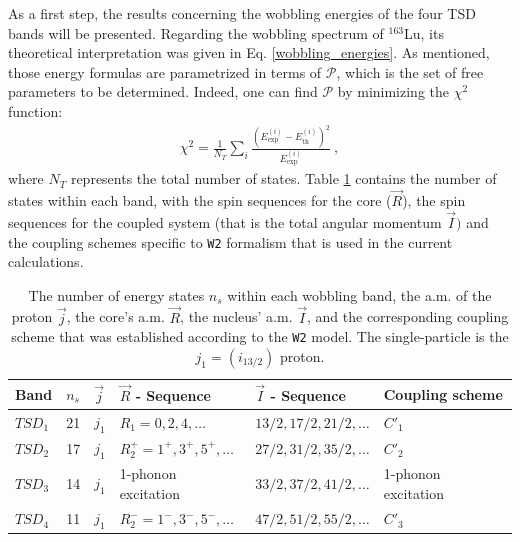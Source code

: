 \documentclass[11pt]{article}
\begin{document}
As a first step, the results concerning the wobbling energies of the four TSD bands will be presented. Regarding the wobbling spectrum of $^{163}$Lu, its theoretical interpretation was given in Eq. \ref{wobbling_energies}. As mentioned, those energy formulas are parametrized in terms of $\mathcal{P}$, which is the set of free parameters to be determined. Indeed, one can find $\mathcal{P}$ by minimizing the $\chi^2$ function:
\begin{align}
    \chi^2=\frac{1}{N_T}\sum_{i}\frac{(E^{(i)}_\text{exp}-E^{(i)}_\text{th})^2}{E^{(i)}_\text{exp}}\ ,
    \label{chi-square}
\end{align}
where $N_T$ represents the total number of states. Table \ref{4-band-information} contains the number of states within each band, with the spin sequences for the core ($\vec{R}$), the spin sequences for the coupled system (that is the total angular momentum $\vec{I})$ and the coupling schemes specific to \texttt{W2} formalism that is used in the current calculations. 

\begin{table}
    \centering
  \begin{tabular}{llllll}
  \hline
  Band & $n_s$ & $\vec{j}$ & $\vec{R}$ - Sequence & $\vec{I}$ - Sequence & Coupling scheme \\
  \hline
  \hline
     $TSD_1$ &       21      &   $j_1$  &        $R_1=0,2,4,\dots$         &   $13/2,17/2,21/2,\dots$    & $C'_1$     \\
     $TSD_2$ &        17     &   $j_1$   &       $R_2^+=1^+,3^+,5^+,\dots$             &      $27/2,31/2,35/2,\dots$                &      $C'_2$           \\
     $TSD_3$ &      14       &    $j_1$  &           1-phonon excitation         & $33/2,37/2,41/2,\dots$                &       1-phonon excitation           \\
     $TSD_4$ &       11      &   $j_1$   &    $R_2^-=1^-,3^-,5^-,\dots$                &               $47/2,51/2,55/2,\dots$         &      $C'_3$          \\
     \hline
\end{tabular}
    \caption{The number of energy states $n_s$ within each wobbling band, the a.m. of the proton $\vec{j}$, the core's a.m. $\vec{R}$, the nucleus' a.m. $\vec{I}$, and the corresponding coupling scheme that was established according to the \texttt{W2} model. The single-particle is the $j_1=(i_{13/2})$ proton.}
    \label{4-band-information}
\end{table}
\end{document}
